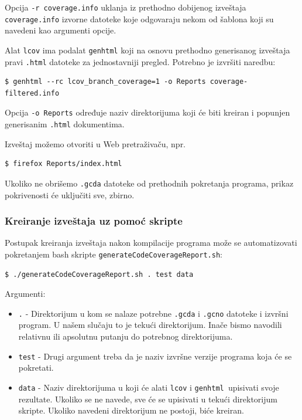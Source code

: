 Opcija \texttt{-r\ coverage.info} uklanja iz prethodno dobijenog izveštaja \texttt{coverage.info} izvorne datoteke koje odgovaraju nekom od šablona koji su navedeni kao argumenti opcije.

Alat \texttt{lcov} ima podalat \texttt{genhtml} koji na osnovu prethodno generisanog izveštaja pravi \texttt{.html} datoteke za jednostavniji pregled. Potrebno je izvršiti naredbu:

\begin{verbatim}
$ genhtml --rc lcov_branch_coverage=1 -o Reports coverage-filtered.info
\end{verbatim}

Opcija \texttt{-o\ Reports} određuje naziv direktorijuma koji će biti kreiran i popunjen generisanim \texttt{.html} dokumentima.

Izveštaj možemo otvoriti u Web pretraživaču, npr.

\begin{verbatim}
$ firefox Reports/index.html
\end{verbatim}

Ukoliko ne obrišemo \texttt{.gcda} datoteke od prethodnih pokretanja programa, prikaz pokrivenosti će uključiti sve, zbirno.

\subsubsection{Kreiranje izveštaja uz pomoć skripte}\label{kreiranje-izveux161taja-uz-pomoux107-skripte}

Postupak kreiranja izveštaja nakon kompilacije programa može se automatizovati pokretanjem bash skripte \texttt{generateCodeCoverageReport.sh}:

\begin{verbatim}
$ ./generateCodeCoverageReport.sh . test data
\end{verbatim}

Argumenti:

\begin{itemize}
\tightlist
\item
  \texttt{.} - Direktorijum u kom se nalaze potrebne \texttt{.gcda} i \texttt{.gcno} datoteke i izvršni program. U našem slučaju to je tekući direktorijum. Inače bismo navodili relativnu ili apsolutnu putanju do potrebnog direktorijuma.
\item
  \texttt{test} - Drugi argument treba da je naziv izvršne verzije programa koja će se pokretati.
\item
  \texttt{data} - Naziv direktorijuma u koji će alati \texttt{lcov} i \texttt{genhtml\ }upisivati svoje rezultate. Ukoliko se ne navede, sve će se upisivati u tekući direktorijum skripte. Ukoliko navedeni direktorijum ne postoji, biće kreiran.
\end{itemize}

